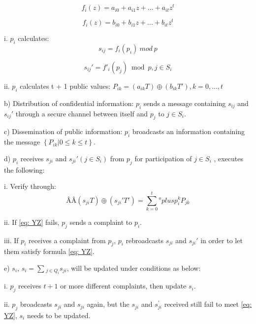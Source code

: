 \documentclass[a4paper,12pt]{article}
\begin{document}
\begin{equation}
  \label{eq: TA}
  f_i (z) = a_{i0} + a_{i1} z + ... + a_{it} z^t
\end{equation}

\begin{equation}
  \label{eq: TA}
  f_i (z) = b_{i0} + b_{i1} z + ... + b_{it} z^t
\end{equation}

i. $p_i$ calculates:
\begin{equation}
  \label{eq: TA}
 s_{ij} = f_i(p_i)\ mod \ p
\end{equation}

\begin{equation}
  \label{eq: TA}
 {s_{ij}}'= f{'_i} \left({{p_j}} \right) \bmod p, j \in{S_i}%
\end{equation}

ii. $p_i$ calculates t + 1 public values: ${P_{ik}} = \left({{a_{ik}} T} \right) \oplus \left({{b_{ik}} T' } \right), k = 0, ..., t$

b) Distribution of confidential information: $p_i$ sends a message containing $s_{ij}$ and ${s_{ij}}'$ through a secure channel between itself and  $p_j$ to $j \in S_i$.

c) Dissemination of public information: $p_i$ broadcasts an information containing the message $\left \{{{P_{ik}}|0 \le k \le t} \right \}$.

d) $ p_i$ receives $s_{ji}$ and ${s_{ji}}'\left(j \in S_i \right)$ from  $ p_j$ for participation of $ j \in S_i$ , executes the following:

i. Verify through:
\begin{equation}
Â Â \label{eq: YZ}
\left({{s_{ji}} T} \right) \oplus \left({{s_{ji}}'T'} \right) = \sum \limits_{k = 0}^t{}^oplus p_i^k{P_{jk}}
\end{equation}

ii. If \ref{eq: YZ} fails, $p_j$ sends a complaint to $p_i$.

iii. If $p_i$ receives a complaint from $p_j$, $ p_i$ rebroadcasts $s_{ji}$ and ${s_{ji}}'$ in order to let them satisfy formula \ref{eq: YZ}.

e) $s_i$,  ${s_i} = \sum \limits _{} ^{}{_{j \in{Q_i} }{s_{ji}}}$, will be updated under conditions as below:

i. $p_j$ receives $t + 1$ or more different complaints, then update $s_i$.

ii. $p_j$ broadcasts $ s_{ji}$ and ${s_{ji}}$ again, but the $ s_{ji}$ and $s_{ji}^{'}$ received still fail to meet \ref{eq: YZ}, $s_i$ needs to be updated.
\end{document}
